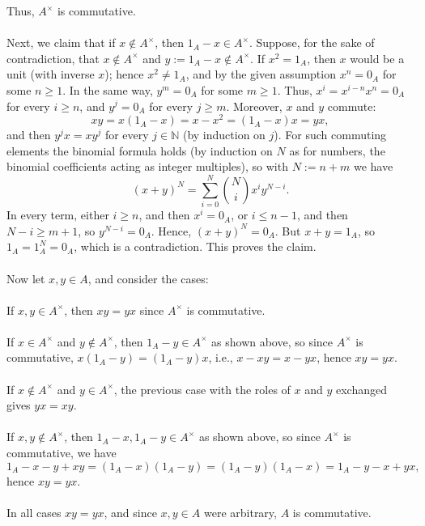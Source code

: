 \begin{solution}
\[    \]
    Thus, \( A^{\times} \) is commutative.
    \\\\
    Next, we claim that if \( x \notin A^{\times} \), then \( 1_A - x \in A^{\times} \). Suppose, for the sake of contradiction, that \( x \notin A^{\times} \) and \( y := 1_A - x \notin A^{\times} \). If \( x^{2} = 1_A \), then \( x \) would be a unit (with inverse \( x \)); hence \( x^{2} \neq 1_A \), and by the given assumption \( x^{n} = 0_A \) for some \( n \geq 1 \). In the same way, \( y^{m} = 0_A \) for some \( m \geq 1 \). Thus, \( x^{i} = x^{i-n} x^{n} = 0_A \) for every \( i \geq n \), and \( y^{j} = 0_A \) for every \( j \geq m \). Moreover, \( x \) and \( y \) commute:
    \[
        xy = x \left( 1_A - x \right) = x - x^{2} = \left( 1_A - x \right) x = yx,
    \]
    and then \( y^{j} x = x y^{j} \) for every \( j \in \mathbb{N} \) (by induction on \( j \)). For such commuting elements the binomial formula holds (by induction on \( N \) as for numbers, the binomial coefficients acting as integer multiples), so with \( N := n + m \) we have
    \[
        \left( x + y \right)^{N} = \sum_{i=0}^{N} \binom{N}{i} x^{i} y^{N-i}.
    \]
    In every term, either \( i \geq n \), and then \( x^{i} = 0_A \), or \( i \leq n - 1 \), and then \( N - i \geq m + 1 \), so \( y^{N-i} = 0_A \). Hence, \( \left( x + y \right)^{N} = 0_A \). But \( x + y = 1_A \), so \( 1_A = 1_A^{N} = 0_A \), which is a contradiction. This proves the claim.
    \\\\
    Now let \( x, y \in A \), and consider the cases:
    \\\\
    If \( x, y \in A^{\times} \), then \( xy = yx \) since \( A^{\times} \) is commutative.
    \\\\
    If \( x \in A^{\times} \) and \( y \notin A^{\times} \), then \( 1_A - y \in A^{\times} \) as shown above, so since \( A^{\times} \) is commutative, \( x \left( 1_A - y \right) = \left( 1_A - y \right) x \), i.e., \( x - xy = x - yx \), hence \( xy = yx \).
    \\\\
    If \( x \notin A^{\times} \) and \( y \in A^{\times} \), the previous case with the roles of \( x \) and \( y \) exchanged gives \( yx = xy \).
    \\\\
    If \( x, y \notin A^{\times} \), then \( 1_A - x, 1_A - y \in A^{\times} \) as shown above, so since \( A^{\times} \) is commutative, we have
    \[
        1_A - x - y + xy = \left( 1_A - x \right) \left( 1_A - y \right) = \left( 1_A - y \right) \left( 1_A - x \right) = 1_A - y - x + yx,
    \]
    hence \( xy = yx \).
    \\\\
    In all cases \( xy = yx \), and since \( x, y \in A \) were arbitrary, \( A \) is commutative.
\end{solution}
